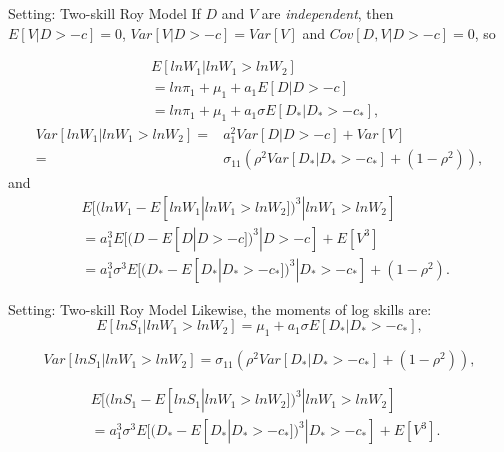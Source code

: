 \documentclass{beamer}
\begin{document}
\begin{frame}{Setting: Two-skill Roy Model}
If $D$ and $V$ are \textit{independent}, then $E[V|D>-c]=0$, $Var[V|D>-c]=Var[V]$ and $Cov[D,V|D>-c]=0$, so

	\begin{equation}\nonumber
	\begin{aligned}
	&E[lnW_1|lnW_1>lnW_2]\\
	&=ln\pi_1+\mu_1+a_1E[D|D>-c] \\
	&=ln\pi_1+\mu_1+a_1\sigma E[D_*|D_*>-c_*],
	\end{aligned}
	\end{equation}
	\begin{equation}\nonumber
	\begin{aligned}
	Var[lnW_1|lnW_1>lnW_2]=&a^2_1Var[D|D>-c]+Var[V] \\
	=&\sigma_{11}(\rho^2Var[D_*|D_*>-c_*]+(1-\rho^2)),
	\end{aligned}
	\end{equation}
and
	\begin{equation}\nonumber
	\begin{aligned}
	&E[(lnW_1-E[lnW_1|lnW_1>lnW_2])^3|lnW_1>lnW_2] \\
	&=a^3_1E[(D-E[D|D>-c])^3|D>-c]+E[V^3] \\
	&=a^3_1\sigma^3E[(D_*-E[D_*|D_*>-c_*])^3|D_*>-c_*]+(1-\rho^2).
	\end{aligned}
	\end{equation}	
\end{frame}
\begin{frame}{Setting: Two-skill Roy Model}
Likewise, the moments of log skills are:
	\begin{equation}\nonumber
	E[lnS_1|lnW_1>lnW_2]=\mu_1+a_1\sigma E[D_*|D_*>-c_*],
	\end{equation}		
	
	\begin{equation}\nonumber
	Var[lnS_1|lnW_1>lnW_2]=\sigma_{11}(\rho^2Var[D_*|D_*>-c_*]+(1-\rho^2)),
	\end{equation}	
	
	\begin{equation}\nonumber
	\begin{aligned}
	&E[(lnS_1-E[lnS_1|lnW_1>lnW_2])^3|lnW_1>lnW_2] \\
	&=a^3_1\sigma^3E[(D_*-E[D_*|D_*>-c_*])^3|D_*>-c_*]+E[V^3].
	\end{aligned}
	\end{equation}

\end{frame}
\end{document}
